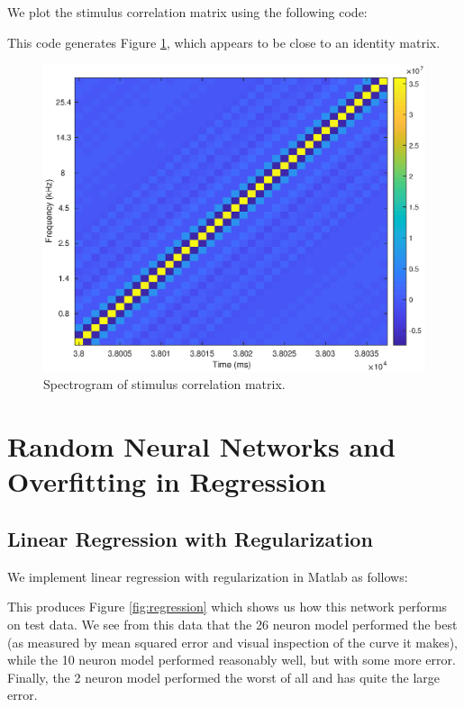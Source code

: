 \documentclass[11pt, oneside]{article}
\begin{document}
We plot the stimulus correlation matrix using the following code:

This code generates Figure \ref{fig:stim_corr}, which appears to be close to an identity matrix.

\begin{figure}[ht!]
\includegraphics[width=1\textwidth]{stimulus_correlation.eps}
\caption{Spectrogram of stimulus correlation matrix.}
\label{fig:stim_corr}
\end{figure}


\section{Random Neural Networks and Overfitting in Regression}

\subsection{Linear Regression with Regularization}

We implement linear regression with regularization in Matlab as follows:

This produces Figure \ref{fig:regression} which shows us how this network performs on test data. We see from this data that the 26 neuron model performed the best (as measured by mean squared error and visual inspection of the curve it makes), while the 10 neuron model performed reasonably well, but with some more error. Finally, the 2 neuron model performed the worst of all and has quite the large error.
\end{document}
